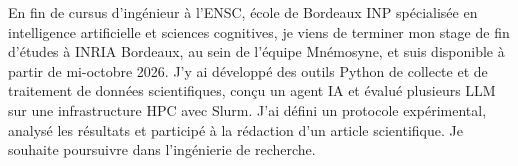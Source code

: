 
\begin{cvparagraph}
En fin de cursus d’ingénieur à l’ENSC, école de Bordeaux INP spécialisée en intelligence artificielle et sciences cognitives, je viens de terminer mon stage de fin d’études à INRIA Bordeaux, au sein de l’équipe Mnémosyne, et suis disponible à partir de mi-octobre 2026. J’y ai développé des outils Python de collecte et de traitement de données scientifiques, conçu un agent IA et évalué plusieurs LLM sur une infrastructure HPC avec Slurm. J’ai défini un protocole expérimental, analysé les résultats et participé à la rédaction d’un article scientifique. Je souhaite poursuivre dans l’ingénierie de recherche.
\end{cvparagraph}
